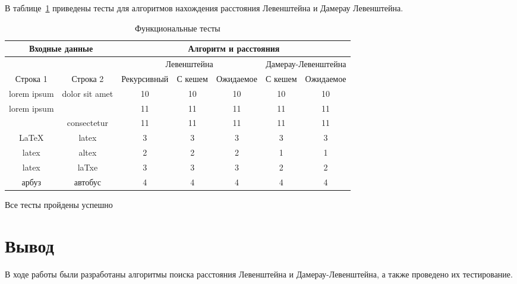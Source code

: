 В таблице~\ref{tbl:func_tests} приведены тесты для алгоритмов нахождения расстояния Левенштейна и Дамерау Левенштейна.

\begin{table}[ht]
  \small
  \caption{Функциональные тесты}
  \label{tbl:func_tests}
  \begin{threeparttable}
    \begin{tabular}{|c|c|c|c|c|c|c|}
        \hline
        \multicolumn{2}{|c|}{\bfseries Входные данные}
        & \multicolumn{5}{c|}{\bfseries Алгоритм и расстояния} \\ 
        \hline
        &
        &
        \multicolumn{3}{c|}{Левенштейна} & \multicolumn{2}{c|}{Дамерау-Левенштейна} \\ \cline{3-7}
        Строка 1 & Строка 2 & Рекурсивный & С кешем &  Ожидаемое & С кешем & Ожидаемое \\
        \hline
        lorem ipsum & dolor sit amet & 10 & 10 & 10 & 10 & 10 \\
        \hline
        lorem ipsum &  & 11 & 11 & 11 & 11 & 11 \\
        \hline
         & consectetur & 11 & 11 & 11 & 11 & 11 \\
        \hline
        LaTeX & latex & 3 & 3 & 3 & 3 & 3 \\
        \hline
        latex & altex & 2 & 2 & 2 & 1 & 1 \\ 
        \hline
        latex & laTxe & 3 & 3 & 3 & 2 & 2 \\ 
        \hline
        арбуз & автобус & 4 & 4 & 4 & 4 & 4 \\ 
        \hline
      \end{tabular}
    \end{threeparttable}
\end{table}

Все тесты пройдены успешно

\section*{Вывод}

В ходе работы были разработаны алгоритмы поиска расстояния Левенштейна и Дамерау-Левенштейна, а также проведено их тестирование.

\clearpage